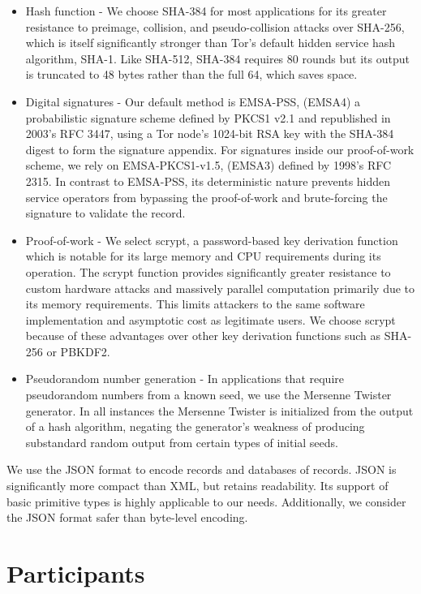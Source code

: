\begin{itemize}
	\item Hash function - We choose SHA-384 for most applications for its greater resistance to preimage, collision, and pseudo-collision attacks over SHA-256, which is itself significantly stronger than Tor's default hidden service hash algorithm, SHA-1. Like SHA-512, SHA-384 requires 80 rounds but its output is truncated to 48 bytes rather than the full 64, which saves space.
	\item Digital signatures - Our default method is EMSA-PSS, (EMSA4) a probabilistic signature scheme defined by PKCS1 v2.1 and republished in 2003's RFC 3447, using a Tor node's 1024-bit RSA key with the SHA-384 digest to form the signature appendix. For signatures inside our proof-of-work scheme, we rely on EMSA-PKCS1-v1.5, (EMSA3) defined by 1998's RFC 2315. In contrast to EMSA-PSS, its deterministic nature prevents hidden service operators from bypassing the proof-of-work and brute-forcing the signature to validate the record.
	\item Proof-of-work - We select scrypt, a password-based key derivation function which is notable for its large memory and CPU requirements during its operation. The scrypt function provides significantly greater resistance to custom hardware attacks and massively parallel computation primarily due to its memory requirements. This limits attackers to the same software implementation and asymptotic cost as legitimate users.\cite{percival2009stronger} We choose scrypt because of these advantages over other key derivation functions such as SHA-256 or PBKDF2.
	\item Pseudorandom number generation - In applications that require pseudorandom numbers from a known seed, we use the Mersenne Twister generator. In all instances the Mersenne Twister is initialized from the output of a hash algorithm, negating the generator's weakness of producing substandard random output from certain types of initial seeds.
\end{itemize}

We use the JSON format to encode records and databases of records. JSON is significantly more compact than XML, but retains readability. Its support of basic primitive types is highly applicable to our needs. Additionally, we consider the JSON format safer than byte-level encoding.

\section{Participants}

